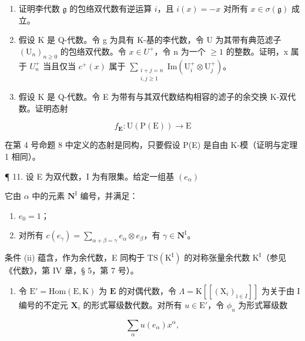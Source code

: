 \begin{enumerate}
\def\labelenumi{\arabic{enumi}.}
\setcounter{enumi}{7}
\item
  证明李代数 \(\mathfrak{g}\) 的包络双代数有逆运算 \(i\)，且 \(i(x) = -x\) 对所有 \(x \in \sigma(\mathfrak{g})\) 成立。
\item
  假设 K 是 Q-代数。令 g 为具有 K-基的李代数，令 U 为其带有典范滤子 \((\mathrm{U}_{n})_{n\geqslant0}\) 的包络双代数。令 \(x\in U^{+}\)，令 n 为一个 \(\geqslant1\) 的整数。证明，x 属于 \(U_{n}^{+}\) 当且仅当 \(c^{+}(x)\) 属于 \(\sum_{\substack{i+j=n\\ i,j\geqslant1}}\mathrm{Im}(\mathrm{U}_{i}^{+}\otimes\mathrm{U}_{j}^{+})\)。
\item
  假设 K 是 Q-代数。令 E 为带有与其双代数结构相容的滤子的余交换 K-双代数。证明态射
\end{enumerate}

\[
f _ {\mathbf {E}} \colon \mathrm{U} (\mathrm{P} (\mathrm{E})) \rightarrow \mathrm{E}
\]

在第 4 号命题 8 中定义的态射是同构，只要假设 P(E) 是自由 K-模（证明与定理 1 相同）。

¶ 11. 设 E 为双代数，I 为有限集。给定一组基 \((e_{\alpha})\)

它由 \(\alpha\) 中的元素 \(\mathbf{N}^{\mathrm{I}}\) 编号，并满足：

\begin{enumerate}
\def\labelenumi{(\roman{enumi})}
\item
  \(e_{0} = 1\)；
\item
  对所有 \(c(e_{\gamma}) = \sum_{\alpha + \beta = \gamma} e_{\alpha} \otimes e_{\beta}\)，有 \(\gamma \in \mathbf{N}^{\mathrm{I}}\)。
\end{enumerate}

条件 (ii) 蕴含，作为余代数，E 同构于 \(\mathrm{TS}(\mathrm{K}^{\mathrm{I}})\) 的对称张量余代数 \(\mathrm{K}^{\mathrm{I}}\)（参见《代数》，第 IV 章，§ 5，第 7 号）。

\begin{enumerate}
\def\labelenumi{(\alph{enumi})}
\tightlist
\item
  令 \(\mathrm{E}' = \mathrm{Hom}(\mathrm{E},\mathrm{K})\) 为 \(\mathbf{E}\) 的对偶代数，令 \(\Lambda = \mathrm{K}[[(\mathrm{X}_i)_{\mathrm{i}\in I}]]\) 为关于由 I 编号的不定元 \(\mathbf{X}_i\) 的形式幂级数代数。对所有 \(u\in \mathrm{E}'\)，令 \(\phi_u\) 为形式幂级数
\end{enumerate}

\[
\sum_ {\alpha} u (e _ {\alpha}) x ^ {\alpha},
\]

